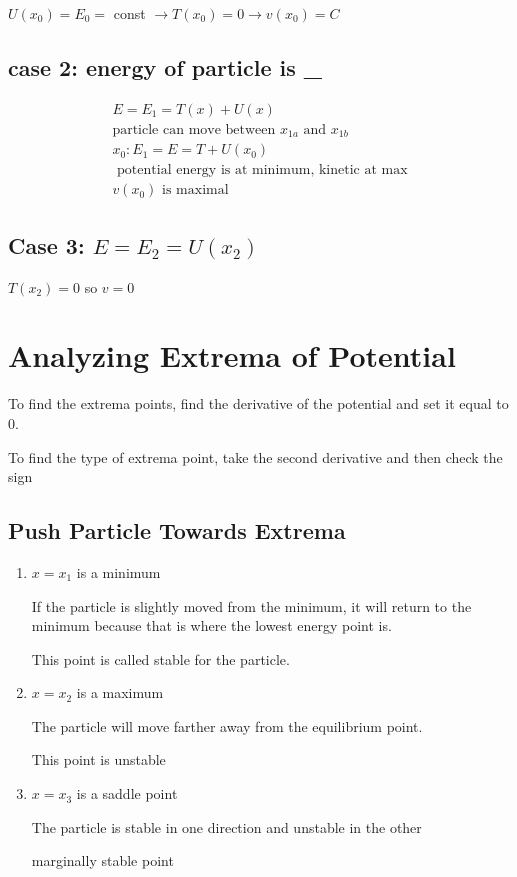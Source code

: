 \documentclass[fleqn]{report}
\newcommand{\equations} [1] {
\begin{gather*}
#1
\end{gather*}
}
\begin{document}
$U(x_0) = E_0 =$ const $\rightarrow T(x_0) = 0 \rightarrow v(x_0) = C$

\subsection{case 2: energy of particle is \_}
\equations{
    E = E_1 = T(x) + U(x)
    \\
    \textrm{particle can move between $x_{1a}$ and $x_{1b}$}
    \\
    x_0: E_1 = E = T + U(x_0) 
    \\
    \textrm{ potential energy is at minimum, kinetic at max}
    \\
    \textrm{$v(x_0)$ is maximal}
}

\subsection{Case 3: $E = E_2 = U(x_2)$}
$T(x_2) = 0$ so $v = 0$

\section{Analyzing Extrema of Potential}
To find the extrema points, find the derivative of the potential and set it 
equal to 0.

To find the type of extrema point, take the second derivative and then check the
sign

\subsection{Push Particle Towards Extrema}
\begin{enumerate}
\item
$x = x_1$ is a minimum

If the particle is slightly moved from the minimum, it will return to the minimum
 because that is where the lowest energy point is. 

This point is called stable for the particle.
\item
$x = x_2$ is a maximum

The particle will move farther away from the equilibrium point.

This point is unstable
\item
$x = x_3$ is a saddle point

The particle is stable in one direction and unstable in the other

marginally stable point 
\end{enumerate}
\end{document}
